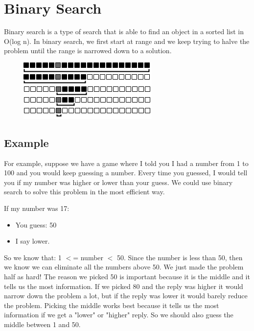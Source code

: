 \documentclass[11pt,oneside]{book}
\makeatletter
\def\maxwidth#1{\ifdim\Gin@nat@width>#1 #1\else\Gin@nat@width\fi}
\makeatother
\begin{document}
        \section{ Binary Search }
        

Binary search is a type of search that is able to find an object in a sorted list in O(log n). In binary search, we first start at range and we keep trying to halve the problem until the range is narrowed down to a solution.

\vspace{5px}\begin{figure}[H]\centering
        \includegraphics[width=0.66\maxwidth{\textwidth}]{binarysearch.png}
        \end{figure}

\subsection{Example}

For example, suppose we have a game where I told you I had a number from 1 to 100 and you would keep guessing a number. Every time you guessed, I would tell you if my number was higher or lower than your guess. We could use binary search to solve this problem in the most efficient way.

If my number was 17:

\begin{itemize}
\item You guess: 50
\item I say lower.
\end{itemize}

So we know that: 1 $<$= number $<$ 50. Since the number is less than 50, then we know we can eliminate all the numbers above 50. We just made the problem half as hard! The reason we picked 50 is important because it is the middle and it tells us the most information. If we picked 80 and the reply was higher it would narrow down the problem a lot, but if the reply was lower it would barely reduce the problem. Picking the middle works best because it tells us the most information if we get a "lower" or "higher" reply. So we should also guess the middle between 1 and 50.
\end{document}
